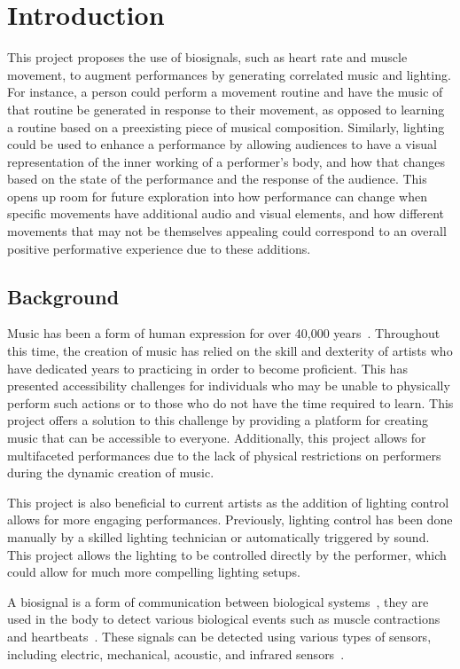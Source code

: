 \chapter{Introduction}
This project proposes the use of biosignals, such as heart rate and muscle movement, to augment performances by generating correlated music and lighting.
For instance, a person could perform a movement routine and have the music of that routine be generated in response to their movement,
as opposed to learning a routine based on a preexisting piece of musical composition.
Similarly, lighting could be used to enhance a performance by allowing audiences to have a visual representation of the inner working of a performer's body,
and how that changes based on the state of the performance and the response of the audience.
This opens up room for future exploration into how performance can change when specific movements have additional audio and visual elements,
and how different movements that may not be themselves appealing could correspond to an overall positive performative experience due to these additions.

\section{Background}
Music has been a form of human expression for over 40,000 years~\cite{killin:2018}.
Throughout this time, the creation of music has relied on the skill and dexterity of artists
who have dedicated years to practicing in order to become proficient.
This has presented accessibility challenges for individuals who may be unable to physically perform such actions
or to those who do not have the time required to learn.
This project offers a solution to this challenge by providing a platform for creating music that can be accessible to everyone.
Additionally, this project allows for multifaceted performances due to the lack of physical restrictions on performers
during the dynamic creation of music.

This project is also beneficial to current artists as the addition of lighting control allows for more engaging performances.
Previously, lighting control has been done manually by a skilled lighting technician or automatically triggered by sound.
This project allows the lighting to be controlled directly by the performer, which could allow for much more compelling lighting setups.

A biosignal is a form of communication between biological systems~\cite{semmlow:2018},
they are used in the body to detect various biological events such as muscle contractions and heartbeats~\cite{escabí:2012}.
These signals can be detected using various types of sensors, including electric, mechanical, acoustic, and infrared sensors~\cite{kaniusas:2012}.

